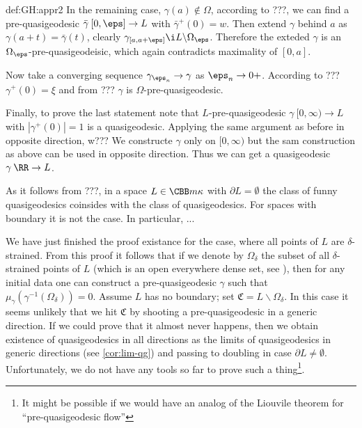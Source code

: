 {\begin{subthm}{def:GH:appr2}
In the remaining case, $\gamma(a)\not\in\Omega$, according to ???,
we can find a pre-quasigeodesic $\bar\gamma\:[0,\eps]\to L$ with $\bar\gamma^+(0)=w$.
Then extend $\gamma$ behind $a$ as $\gamma(a+t)=\bar\gamma(t)$, clearly $\gamma_{[a,a+\eps]}\i L\backslash\Omega_\eps$.
Therefore the exteded $\gamma$ is an $\Omega_\eps$-pre-quasigeodeisic, 
which again contradicts maximality of $[0,a]$. 

Now take a converging sequence $\gamma_{\eps_n}\to\gamma$ as $\eps_n\to0+$.
According to ??? $\gamma^+(0)=\xi$ and from ??? $\gamma$ is $\Omega$-pre-quasigeodesic.

Finally, to prove the last statement note that $L$-pre-quasigeodesic $\gamma\:[0,\infty)\to L$ with $|\gamma^+(0)|=1$ is a quasigeodesic.
Applying the same argument as before in opposite direction, w???
We constructe $\gamma$ only on $[0,\infty)$ but the sam construction as above can be used in opposite direction.
Thus we can get a quasigeodesic $\gamma\:\RR\to L$.\qeds


















As it follows from ???, in a space $L\in \CBB m\kappa$ with $\partial L=\emptyset$ the class of funny quasigeodesics coinsides with the class of quasigeodesics.
For spaces with boundary it is not the case. 
In particular, ...




We have just finished the proof existance for the case, 
where all points of $L$ are $\delta$-strained. 
From this proof it follows that if we denote by $\Omega_\delta$ the subset of all
$\delta$-strained points of $L$ (which is an open everywhere dense set, see
\cite[5.9]{BGP}), then for any initial data one can construct a pre-quasigeodesic
$\gamma$ such that $\mu_\gamma(\gamma^{-1}(\Omega_\delta))=0$.
Assume $L$ has no boundary; set $\mathfrak C=L\backslash
\Omega_\delta$. 
In this case it seems unlikely that we hit $\mathfrak C$ by shooting a pre-quasigeodesic in a generic direction.
If we could prove that it almost never happens, then we obtain existence of
quasigeodesics in all directions as the limits of quasigeodesics in generic directions
(see \ref{cor:lim-qg}) and passing to doubling in case $\partial L\not=\emptyset$.
Unfortunately, we do not have any tools so far to prove such a thing\footnote{It
might be possible if we would have an analog of the Liouvile theorem for
``pre-quasigeodesic flow''}. 



















\end{subthm}}
